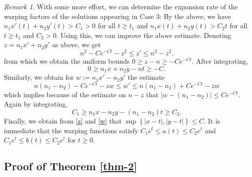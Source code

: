 \documentclass[a4paper,10pt]{article}
\theoremstyle{plain}
\theoremstyle{definition}
\theoremstyle{remark}
\newtheorem{rem}[thm]{Remark}
\theoremstyle{plain}
\newcommand{\eq}[1]{\begin{equation}#1\end{equation}}
\numberwithin{equation}{section}
\begin{document}
	\begin{rem}\label{expansionrate}	With some more effort, we can determine the expansion rate of the warping factors of the  solutions appearing in Case 3:	
		By the above, we have $n_1x'(t)+n_2y'(t)>C_1>0$ for all $t\geq t_1$ and $n_1x(t)+n_2y(t)>C_2t$ for all $t\geq t_1$ and $C_2>0$. Using this, we can improve the above estimate. Denoting $z=n_1x'+n_2y'$ as above, we get
		\eq{
			n^2-Ce^{-Ct}-z^2\leq z'\leq n^2-z^2.
		}	
		from which we obtain the uniform bounds $0\geq z-n\geq -Ce^{-Ct}$. After integrating,
		\eq{\label{z}0\geq n_1x+n_2y-nt\geq -C.}
		Similarly, we obtain for $w:=n_1x'-n_2y'$ the estimate
		\eq{ n(n_1-n_2)-Ce^{-C t} -zw \leq w'\leq  n(n_1-n_2)+Ce^{-C t} -zw}
		which implies because of the estimate on $n-z$ that $|w-(n_1-n_2)|\leq Ce^{-Ct}$. Again by integrating,
		\eq{\label{w}{C_1\geq n_1x-n_2y-(n_1-n_2)t\geq C_2.}}	
		Finally, we obtain from \eqref{z} and \eqref{w} that $\sup \left\{|x-t|,|y-t|\right\}\leq C$. It is immediate that the warping functions satisfy $C_1 e^t\leq a(t) \leq C_2e^t$ and $C_1 e^t\leq b(t) \leq C_2e^t$ for $t\geq0$.
		\end{rem}
		


\subsection{Proof of Theorem \ref{thm-2}}
\end{document}
